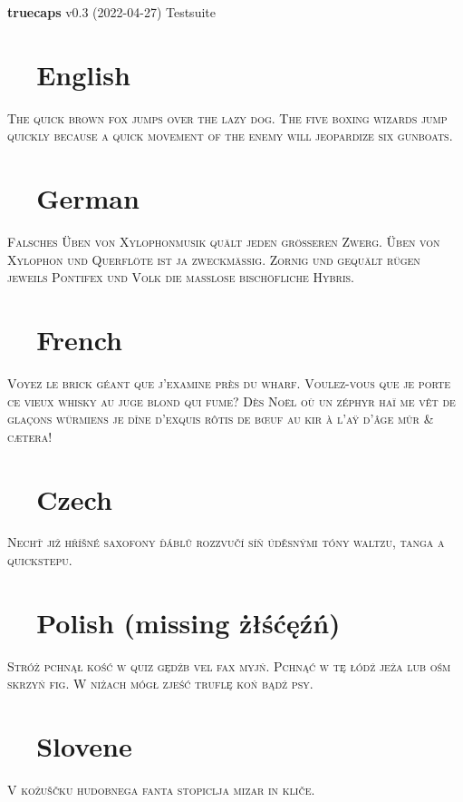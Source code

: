 \documentclass{article}
\def\checkno	{\textcolor{red}{\textbf{\ding{55}~~}}}
\def\checkyes	{\textcolor{green}{\textbf{\ding{51}~~}}}
\begin{document}
\hfill{\Large \textbf{truecaps} v0.3 (2022-04-27) Testsuite}

\vspace{-1em}\section*{\checkyes English}
\textsc{The quick brown fox jumps over the lazy dog.
The five boxing wizards jump quickly because 
a quick movement of the enemy will jeopardize six gunboats.}

\vspace{-1em}\section*{\checkyes German}
\noindent\textsc{Falsches Üben von Xylophonmusik quält jeden größeren Zwerg.
Üben von Xylophon und Querflöte ist ja zweckmäßig. 
Zornig und gequält rügen jeweils Pontifex und Volk die maßlose bischöfliche Hybris.}

\vspace{-1em}\section*{\checkyes French}
\noindent\textsc{Voyez le brick géant que j’examine près du wharf.
Voulez-vous que je porte ce vieux whisky au juge blond qui fume\medspace?
Dès Noël où un zéphyr haï me vêt de glaçons würmiens 
je dîne d’exquis rôtis de bœuf au kir à l’aÿ d’âge mûr \& cætera\medspace!}

\vspace{-1em}\section*{\checkyes Czech}
\noindent\textsc{Nechť již hříšné saxofony ďáblů rozzvučí síň úděsnými 
tóny waltzu, tanga a quickstepu.}

\vspace{-1em}\section*{\checkno Polish (missing \string żłśćęźń)}
\noindent\textsc{
Stróż pchnął kość w quiz gędźb vel fax myjń. 
Pchnąć w tę łódź jeża lub ośm skrzyń fig.
W niżach mógł zjeść truflę koń bądź psy.
}

\vspace{-1em}\section*{\checkyes Slovene}
\noindent\textsc{
V kožuščku hudobnega fanta stopiclja mizar in kliče.
}
\end{document}
